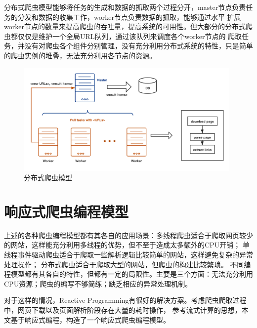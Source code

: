 \documentclass[master]{njuthesis}
\begin{document}
分布式爬虫模型能够将任务的生成和数据的抓取两个过程分开，master节点负责任务的分发和数据的收集工作，worker节点负责数据的抓取，能够通过水平
扩展worker节点的数量来提高爬虫的吞吐量，提高系统的可用性。但大部分的分布式爬虫都仅仅是维护一个全局URL队列，通过该队列来调度各个worker节点的
爬取任务，并没有对爬虫各个组件分别管理，没有充分利用分布式系统的特性，只是简单的爬虫实例的堆叠，无法充分利用各节点的资源。
\begin{figure}[htbp]
\centering
\includegraphics[width= 0.98\textwidth]{pic/distributed.png}
\caption{分布式爬虫模型}\label{fig:distributed}
\end{figure}



\section{响应式爬虫编程模型}
上述的各种爬虫编程模型都有其各自的应用场景：多线程爬虫适合于爬取网页较少的网站，这样能充分利用多线程的优势，但不至于造成太多额外的CPU开销；
单线程事件驱动爬虫适合于爬取一些解析逻辑比较简单的网站，这样避免复杂的异常处理操作；
分布式爬虫适合于爬取大型的网站，但爬虫的构建比较繁琐。
不同编程模型都有其各自的特性，但都有一定的局限性。主要是三个方面：无法充分利用CPU资源；爬虫的编写不够简练；缺乏相应的异常处理机制。

对于这样的情况，Reactive Programming有很好的解决方案。考虑爬虫爬取过程中，网页下载以及页面解析阶段存在大量的耗时操作，
参考流式计算的思想，本文基于响应式编程，构造了一个响应式爬虫编程模型。
\end{document}
